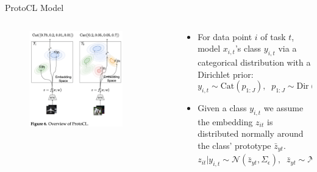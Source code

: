 \documentclass[12pt,aspectratio=169, handout]{beamer}
\let\olditem\item
\renewcommand\item{\olditem\justifying}
\begin{document}
\begin{frame}{ProtoCL Model}
\begin{columns}
    \begin{column}{0.4\textwidth}
        \begin{figure}
		\centering
		\includegraphics[width=0.8\textwidth]{"images/Fig6_full.png"}
	\end{figure}
    \end{column} 
    \begin{column}{0.6\textwidth}
        \begin{itemize}[<+->]
            \item For data point $i$ of task $t$, model $x_{i,t}$'s class $y_{i,t}$ via a categorical distribution with a Dirichlet prior:
            $$y_{i,t} \sim \mathrm{Cat}(p_{1:J}), \;\; p_{1:J} \sim \mathrm{Dir}(\alpha_t)$$
            \item Given a class $y_{i,t}$ we assume the embedding $z_{it}$ is distributed normally around the class' prototype $\bar{z}_{yt}$.
            $$z_{it} | y_{i,t} \sim \mathcal{N}(\bar{z}_{yt}, \Sigma_\epsilon), \;\; \bar{z}_{yt} \sim \mathcal{N}(\mu_{yt}, \Lambda_{yt}^{-1})$$
            
        \end{itemize}
    \end{column}
\end{columns}
\end{frame}
\end{document}
